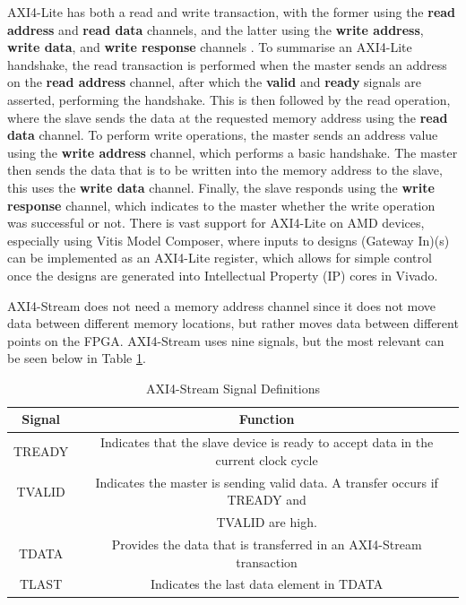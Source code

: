 \documentclass[12pt, a4paper]{article}
\begin{document}
AXI4-Lite has both a read and write transaction, with the former using the \textbf{read address} and \textbf{read data} channels, and the latter using the \textbf{write address}, \textbf{write data}, and \textbf{write response} channels \cite{strathsdr_axi}. To summarise an AXI4-Lite handshake, the read transaction is performed when the master sends an address on the \textbf{read address} channel, after which the \textbf{valid} and \textbf{ready} signals are asserted, performing the handshake. This is then followed by the read operation, where the slave sends the data at the requested memory address using the \textbf{read data} channel. To perform write operations, the master sends an address value using the \textbf{write address} channel, which performs a basic handshake. The master then sends the data that is to be written into the memory address to the slave, this uses the \textbf{write data} channel. Finally, the slave responds using the \textbf{write response} channel, which indicates to the master whether the write operation was successful or not. There is vast support for AXI4-Lite on AMD devices, especially using Vitis Model Composer, where inputs to designs (Gateway In)(s) can be implemented as an AXI4-Lite register, which allows for simple control once the designs are generated into Intellectual Property (IP) cores in Vivado.
 

AXI4-Stream does not need a memory address channel since it does not move data between different memory locations, but rather moves data between different points on the FPGA. AXI4-Stream uses nine signals, but the most relevant can be seen below in Table \ref{tab:AXI4-Stream signals}.

\begin{table}[h]
    \centering
    \begin{tabular}{|c|c|}\hline
        \textbf{Signal} & \textbf{Function} \\ \hline
         TREADY &  Indicates that the slave device is ready to accept data in the current clock cycle\\ \hline
         TVALID &  Indicates the master is sending valid data. A transfer occurs if TREADY and\\ 
         & TVALID are high. \\ \hline
         TDATA & Provides the data that is transferred in an AXI4-Stream transaction \\ \hline
         TLAST & Indicates the last data element in TDATA \\ \hline
    \end{tabular}
    \caption{AXI4-Stream Signal Definitions}
    \label{tab:AXI4-Stream signals}
\end{table}
\end{document}
